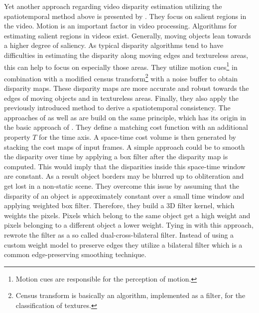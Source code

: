 \noindent Yet another approach regarding video disparity estimation utilizing the spatiotemporal method above is presented by \citeauthor{lee2012local} \citep{lee2012local}.
They focus on salient regions in the video.
Motion is an important factor in video processing.
Algorithms for estimating salient regions in videos exist.
Generally, moving objects lean towards a higher degree of saliency.
As typical disparity algorithms tend to have difficulties in estimating the disparity along moving edges and textureless areas, this can help to focus on especially those areas.
They utilize motion cues\footnote{Motion cues are responsible for the perception of motion.} in combination with a modified census transform\footnote{Census transform is basically an algorithm, implemented as a filter, for the classification of textures.} with a noise buffer to obtain disparity maps.
These disparity maps are more accurate and robust towards the edges of moving objects and in textureless areas.
Finally, they also apply the previously introduced method to derive a spatiotemporal consistency.
\newline\newline\noindent The approaches of \citeauthor{richardt2010real} \citep{richardt2010real} as well as \citeauthor{hosni2012temporally} \citep{hosni2012temporally} are build on the same principle, which has its origin in the basic approach of \citeauthor{davis2003spacetime} \citep{davis2003spacetime}.
They define a matching cost function with an additional property $T$ for the time axis.
A space-time cost volume is then generated by stacking the cost maps of input frames.
A simple approach could be to smooth the disparity over time by applying a box filter after the disparity map is computed.
This would imply that the disparities inside this space-time window are constant.
As a result object borders may be blurred up to obliteration and get lost in a non-static scene.
They overcome this issue by assuming that the disparity of an object is approximately constant over a small time window and applying weighted box filter.
Therefore, they build a 3D filter kernel, which weights the pixels.
Pixels which belong to the same object get a high weight and pixels belonging to a different object a lower weight.
\newline\newline\noindent Tying in with this approach, \citeauthor{richardt2010real} \citep{richardt2010real} rewrote the filter as a so called dual-cross-bilateral filter.
Instead of using a custom weight model to preserve edges they utilize a bilateral filter which is a common edge-preserving smoothing technique.
